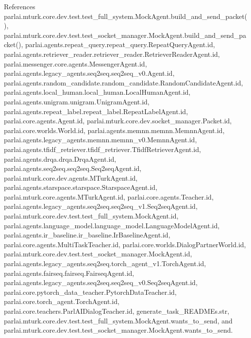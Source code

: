 References parlai.\+mturk.\+core.\+dev.\+test.\+test\+\_\+full\+\_\+system.\+Mock\+Agent.\+build\+\_\+and\+\_\+send\+\_\+packet(), parlai.\+mturk.\+core.\+dev.\+test.\+test\+\_\+socket\+\_\+manager.\+Mock\+Agent.\+build\+\_\+and\+\_\+send\+\_\+packet(), parlai.\+agents.\+repeat\+\_\+query.\+repeat\+\_\+query.\+Repeat\+Query\+Agent.\+id, parlai.\+agents.\+retriever\+\_\+reader.\+retriever\+\_\+reader.\+Retriever\+Reader\+Agent.\+id, parlai.\+messenger.\+core.\+agents.\+Messenger\+Agent.\+id, parlai.\+agents.\+legacy\+\_\+agents.\+seq2seq.\+seq2seq\+\_\+v0.\+Agent.\+id, parlai.\+agents.\+random\+\_\+candidate.\+random\+\_\+candidate.\+Random\+Candidate\+Agent.\+id, parlai.\+agents.\+local\+\_\+human.\+local\+\_\+human.\+Local\+Human\+Agent.\+id, parlai.\+agents.\+unigram.\+unigram.\+Unigram\+Agent.\+id, parlai.\+agents.\+repeat\+\_\+label.\+repeat\+\_\+label.\+Repeat\+Label\+Agent.\+id, parlai.\+core.\+agents.\+Agent.\+id, parlai.\+mturk.\+core.\+dev.\+socket\+\_\+manager.\+Packet.\+id, parlai.\+core.\+worlds.\+World.\+id, parlai.\+agents.\+memnn.\+memnn.\+Memnn\+Agent.\+id, parlai.\+agents.\+legacy\+\_\+agents.\+memnn.\+memnn\+\_\+v0.\+Memnn\+Agent.\+id, parlai.\+agents.\+tfidf\+\_\+retriever.\+tfidf\+\_\+retriever.\+Tfidf\+Retriever\+Agent.\+id, parlai.\+agents.\+drqa.\+drqa.\+Drqa\+Agent.\+id, parlai.\+agents.\+seq2seq.\+seq2seq.\+Seq2seq\+Agent.\+id, parlai.\+mturk.\+core.\+dev.\+agents.\+M\+Turk\+Agent.\+id, parlai.\+agents.\+starspace.\+starspace.\+Starspace\+Agent.\+id, parlai.\+mturk.\+core.\+agents.\+M\+Turk\+Agent.\+id, parlai.\+core.\+agents.\+Teacher.\+id, parlai.\+agents.\+legacy\+\_\+agents.\+seq2seq.\+seq2seq\+\_\+v1.\+Seq2seq\+Agent.\+id, parlai.\+mturk.\+core.\+dev.\+test.\+test\+\_\+full\+\_\+system.\+Mock\+Agent.\+id, parlai.\+agents.\+language\+\_\+model.\+language\+\_\+model.\+Language\+Model\+Agent.\+id, parlai.\+agents.\+ir\+\_\+baseline.\+ir\+\_\+baseline.\+Ir\+Baseline\+Agent.\+id, parlai.\+core.\+agents.\+Multi\+Task\+Teacher.\+id, parlai.\+core.\+worlds.\+Dialog\+Partner\+World.\+id, parlai.\+mturk.\+core.\+dev.\+test.\+test\+\_\+socket\+\_\+manager.\+Mock\+Agent.\+id, parlai.\+agents.\+legacy\+\_\+agents.\+seq2seq.\+torch\+\_\+agent\+\_\+v1.\+Torch\+Agent.\+id, parlai.\+agents.\+fairseq.\+fairseq.\+Fairseq\+Agent.\+id, parlai.\+agents.\+legacy\+\_\+agents.\+seq2seq.\+seq2seq\+\_\+v0.\+Seq2seq\+Agent.\+id, parlai.\+core.\+pytorch\+\_\+data\+\_\+teacher.\+Pytorch\+Data\+Teacher.\+id, parlai.\+core.\+torch\+\_\+agent.\+Torch\+Agent.\+id, parlai.\+core.\+teachers.\+Parl\+A\+I\+Dialog\+Teacher.\+id, generate\+\_\+task\+\_\+\+R\+E\+A\+D\+M\+Es.\+str, parlai.\+mturk.\+core.\+dev.\+test.\+test\+\_\+full\+\_\+system.\+Mock\+Agent.\+wants\+\_\+to\+\_\+send, and parlai.\+mturk.\+core.\+dev.\+test.\+test\+\_\+socket\+\_\+manager.\+Mock\+Agent.\+wants\+\_\+to\+\_\+send.

